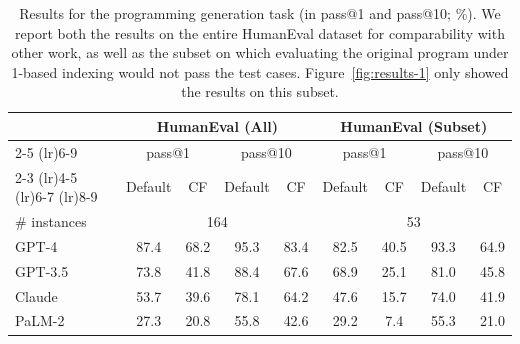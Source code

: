 \begin{table}[t!]
    \centering
    \begin{tabular}{lcccccccc}
        \toprule
        & \multicolumn{4}{c}{HumanEval (All)} & \multicolumn{4}{c}{HumanEval (Subset)} \\
        \cmidrule(lr){2-5}
        \cmidrule(lr){6-9}
        & \multicolumn{2}{c}{pass@1} & \multicolumn{2}{c}{pass@10} & \multicolumn{2}{c}{pass@1} & \multicolumn{2}{c}{pass@10} \\
        \cmidrule(lr){2-3}
        \cmidrule(lr){4-5}
        \cmidrule(lr){6-7}
        \cmidrule(lr){8-9}
        & Default & CF & Default & CF & Default & CF & Default & CF \\
        \midrule
        \# instances & \multicolumn{4}{c}{164} & \multicolumn{4}{c}{53} \\
        \midrule
        GPT-4 & 87.4 & 68.2 & 95.3 & 83.4 & 82.5 & 40.5 & 93.3 & 64.9 \\
        GPT-3.5 & 73.8 & 41.8 & 88.4 & 67.6 & 68.9 & 25.1 & 81.0 & 45.8 \\
        Claude & 53.7 & 39.6 & 78.1 & 64.2 & 47.6 & 15.7 & 74.0 & 41.9 \\
        PaLM-2 & 27.3 & 20.8 & 55.8 & 42.6 & 29.2 & \phantom{0}7.4 & 55.3 & 21.0 \\
        \bottomrule
    \end{tabular}
    \caption{ \label{tab:programming-gen-results}
    Results for the programming generation task (in pass@1 and pass@10; \%).
    We report both the results on the entire HumanEval dataset for comparability with other work, as well as the subset on which evaluating the original program under 1-based indexing would not pass the test cases.
    Figure~\ref{fig:results-1} only showed the results on this subset.
    }
\end{table}




